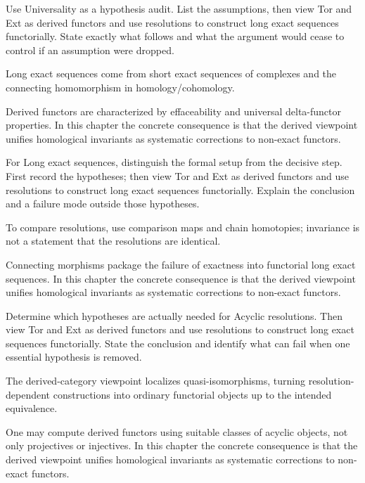 \begin{exercise}\label{exr:v28-06}
Use Universality as a hypothesis audit. List the assumptions, then view Tor and Ext as derived functors and use resolutions to construct long exact sequences functorially. State exactly what follows and what the argument would cease to control if an assumption were dropped.
\end{exercise}
\begin{hint}
Long exact sequences come from short exact sequences of complexes and the connecting homomorphism in homology/cohomology.
\end{hint}
\begin{solution}
Derived functors are characterized by effaceability and universal delta-functor properties. In this chapter the concrete consequence is that the derived viewpoint unifies homological invariants as systematic corrections to non-exact functors.
\end{solution}

\begin{exercise}\label{exr:v28-07}
For Long exact sequences, distinguish the formal setup from the decisive step. First record the hypotheses; then view Tor and Ext as derived functors and use resolutions to construct long exact sequences functorially. Explain the conclusion and a failure mode outside those hypotheses.
\end{exercise}
\begin{hint}
To compare resolutions, use comparison maps and chain homotopies; invariance is not a statement that the resolutions are identical.
\end{hint}
\begin{solution}
Connecting morphisms package the failure of exactness into functorial long exact sequences. In this chapter the concrete consequence is that the derived viewpoint unifies homological invariants as systematic corrections to non-exact functors.
\end{solution}

\begin{exercise}\label{exr:v28-08}
Determine which hypotheses are actually needed for Acyclic resolutions. Then view Tor and Ext as derived functors and use resolutions to construct long exact sequences functorially. State the conclusion and identify what can fail when one essential hypothesis is removed.
\end{exercise}
\begin{hint}
The derived-category viewpoint localizes quasi-isomorphisms, turning resolution-dependent constructions into ordinary functorial objects up to the intended equivalence.
\end{hint}
\begin{solution}
One may compute derived functors using suitable classes of acyclic objects, not only projectives or injectives. In this chapter the concrete consequence is that the derived viewpoint unifies homological invariants as systematic corrections to non-exact functors.
\end{solution}

